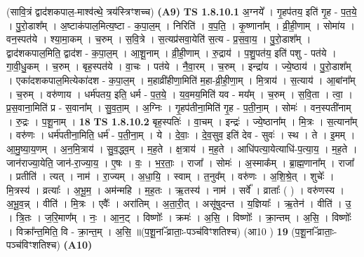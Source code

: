 \documentclass[17pt]{extarticle}
\begin{document}
                  \newline
                      (सावि॒त्रं द्वाद॑शकपाल॒-माश्व॑त्थे॒ त्रय॑स्त्रिꣳशच्च)  \textbf{(A9)} \newline \newline
                                \textbf{ TS 1.8.10.1} \newline
                  अ॒ग्नये᳚ । गृ॒हप॑तय॒ इति॑ गृ॒ह - प॒त॒ये॒ । पु॒रो॒डाश᳚म् । अ॒ष्टाक॑पाल॒मित्य॒ष्टा - क॒पा॒ल॒म् । निरिति॑ । व॒प॒ति॒ । कृ॒ष्णाना᳚म् । व्री॒ही॒णाम् । सोमा॑य । वन॒स्पत॑ये । श्या॒मा॒कम् । च॒रुम् । स॒वि॒त्रे । स॒त्यप्र॑सवा॒येति॑ स॒त्य - प्र॒स॒वा॒य॒ । पु॒रो॒डाश᳚म् । द्वाद॑शकपाल॒मिति॒ द्वाद॑श - क॒पा॒ल॒म् । आ॒शू॒नाम् । व्री॒ही॒णाम् । रु॒द्राय॑ । प॒शु॒पत॑य॒ इति॑ पशु - पत॑ये । गा॒वी॒धु॒कम् । च॒रुम् । बृह॒स्पत॑ये । वा॒चः । पत॑ये । नै॒वा॒रम् । च॒रुम् । इन्द्रा॑य । ज्ये॒ष्ठाय॑ । पु॒रो॒डाश᳚म् । एका॑दशकपाल॒मित्येका॑दश - क॒पा॒ल॒म् । म॒हाव्री॑हीणा॒मिति॑ म॒हा-व्री॒ही॒णा॒म् । मि॒त्राय॑ । स॒त्याय॑ । आ॒बांना᳚म् । च॒रुम् । वरु॑णाय । धर्म॑पतय॒ इति॒ धर्म - प॒त॒ये॒ । य॒व॒मय॒मिति॑ यव - मय᳚म् । च॒रुम् । स॒वि॒ता । त्वा॒ । प्र॒स॒वाना॒मिति॑ प्र - स॒वाना᳚म् । सु॒व॒ता॒म् । अ॒ग्निः । गृ॒हप॑तीना॒मिति॑ गृ॒ह - प॒ती॒ना॒म् । सोमः॑ । वन॒स्पती॑नाम् । रु॒द्रः । प॒शू॒नाम् । \textbf{  18} \newline
                  \newline
                                \textbf{ TS 1.8.10.2} \newline
                  बृह॒स्पतिः॑ । वा॒चम् । इन्द्रः॑ । ज्ये॒ष्ठाना᳚म् । मि॒त्रः । स॒त्याना᳚म् । वरु॑णः । धर्म॑पतीना॒मिति॒ धर्म॑ - प॒ती॒ना॒म् । ये । दे॒वाः॒ । दे॒व॒सुव॒ इति॑ देव - सुवः॑ । स्थ । ते । इ॒मम् । आ॒मु॒ष्या॒य॒णम् । अ॒न॒मि॒त्राय॑ । सु॒व॒द्ध्व॒म् । म॒ह॒ते । क्ष॒त्राय॑ । म॒ह॒ते । आधि॑पत्या॒येत्याधि॑-प॒त्या॒य॒ । म॒ह॒ते । जान॑राज्या॒येति॒ जान॑-रा॒ज्या॒य॒ । ए॒षः । वः॒ । भ॒र॒ताः॒ । राजा᳚ । सोमः॑ । अ॒स्माक᳚म् । ब्रा॒ह्म॒णाना᳚म् । राजा᳚ । प्रतीति॑ । त्यत् । नाम॑ । रा॒ज्यम् । अ॒धा॒यि॒ । स्वाम् । त॒नुव᳚म् । वरु॑णः । अ॒शि॒श्रे॒त् । शुचेः᳚ । मि॒त्रस्य॑ । व्रत्याः᳚ । अ॒भू॒म॒ । अम॑न्महि । म॒ह॒तः । ऋ॒तस्य॑ । नाम॑ । सर्वे᳚ । व्राताः᳚ ( ) । वरु॑णस्य । अ॒भू॒व॒न्न् । वीति॑ । मि॒त्रः । एवैः᳚ । अरा॑तिम् । अ॒ता॒री॒त् । असू॑षुदन्त । य॒ज्ञियाः᳚ । ऋ॒तेन॑ । वीति॑ । उ॒ । त्रि॒तः । ज॒रि॒माण᳚म् । नः॒ । आ॒न॒ट् । विष्णोः᳚ । क्रमः॑ । अ॒सि॒ । विष्णोः᳚ । क्रा॒न्तम् । अ॒सि॒ । विष्णोः᳚ । विक्रा᳚न्त॒मिति॒ वि - क्रा॒न्त॒म् । अ॒सि॒ ॥(प॒शू॒नां-ॅव्राताः॒-पञ्च॑विꣳशतिश्च) (आ10 ) \textbf{  19} \newline
                  \newline
                      (प॒शू॒नां-ॅव्राताः॒-पञ्च॑विꣳशतिश्च)  \textbf{(A10)} \newline \newline
\end{document}
